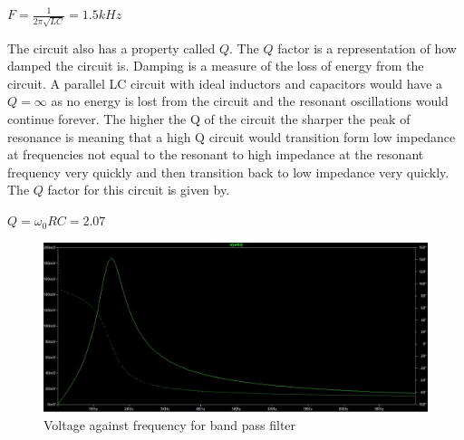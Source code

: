 \documentclass[10pt,a4paper]{article}
\begin{document}
\begin{center}
\Huge

$F=\frac{1}{2\pi\sqrt{LC}} = 1.5kHz$



\end{center}
The circuit also has a property called $Q$. The $Q$ factor is a representation of how damped the circuit is. Damping is a measure of the loss of energy from the circuit. A parallel LC circuit with ideal inductors and capacitors would have a $Q = \infty$ as no energy is lost from the circuit and the resonant oscillations would continue forever. The higher the Q of the circuit the sharper the peak of resonance is meaning that a high Q circuit would transition form low impedance at frequencies not equal to the resonant to high impedance at the resonant frequency very quickly and then transition back to low impedance very quickly. The $Q$ factor for this circuit is given by. 




\begin{center}
\Huge

$Q= \omega_0RC = 2.07$



\end{center}


\begin{figure}[!h]
\includegraphics[width=\textwidth]{BPFgraph}
\caption{Voltage against frequency for band pass filter}
\label{BPFgraph}
\end{figure}
\end{document}
